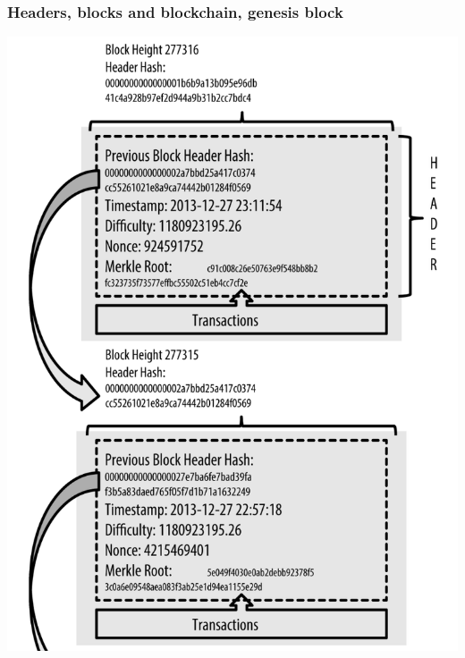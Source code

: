 \documentclass[11pt]{beamer}  %
\begin{document}
\begin{frame}\frametitle{Headers, blocks and blockchain, genesis block}

  \begin{center}
    \includegraphics[scale=0.2,clip=false]{pictures/bitcoin-blocks.png}
  \end{center}

\end{frame}
\end{document}
